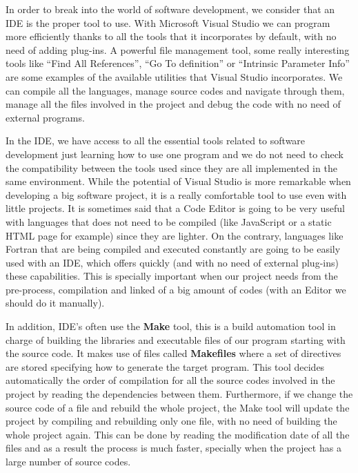 In order to break into the world of software development, we consider that an IDE is the proper tool to use. With Microsoft Visual Studio we can program more efficiently thanks to all the tools that it incorporates by default, with no need of adding plug-ins. A powerful file management tool, some really interesting tools like ``Find All References'', ``Go To definition'' or ``Intrinsic Parameter Info'' are some examples of the available utilities that Visual Studio incorporates. We can compile all the languages, manage source codes and navigate through them, manage all the files involved in the project and debug the code with no need of external programs. 

In the IDE, we have access to all the essential tools related to software development just learning how to use one program and we do not need to check the compatibility between the tools used since they are all implemented in the same environment. While the potential of Visual Studio is more remarkable when developing a big software project, it is a really comfortable tool to use even with little projects. It is sometimes said that a Code Editor is going to be very useful with languages that does not need to be compiled (like JavaScript or a static HTML page for example) since they are lighter. On the contrary, languages like Fortran that are being compiled and executed constantly are going to be easily used with an IDE, which offers quickly (and with no need of external plug-ins) these capabilities. This is specially important when our project needs from the pre-process, compilation and linked of a big amount of codes (with an Editor we should do it manually). 

In addition, IDE's often use the \textbf{Make} tool, this is a build automation tool in charge of building the libraries and executable files of our program starting with the source code. It makes use of files called \textbf{Makefiles} where a set of directives are stored specifying how to generate the target program. This tool decides automatically the order of compilation for all the source codes involved in the project by reading the dependencies between them. Furthermore, if we change the source code of a file and rebuild the whole project, the Make tool will update the project by compiling and rebuilding only one file, with no need of building the whole project again. This can be done by reading the modification date of all the files and as a result the process is much faster, specially when the project has a large number of source codes. 

